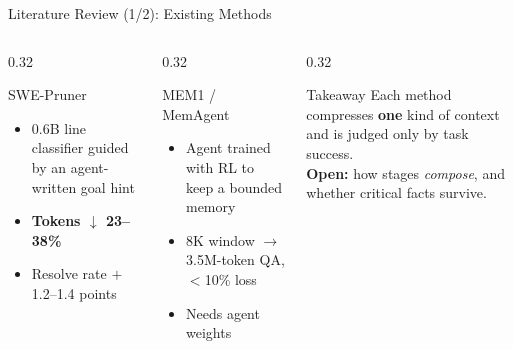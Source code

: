 \documentclass[aspectratio=169,10pt]{beamer}
\begin{document}
\begin{frame}{Literature Review (1/2): Existing Methods}
\begin{columns}[T]
\begin{column}{0.32\textwidth}
\begin{block}{SWE-Pruner \cite{SWEPruner}}
\footnotesize
\begin{itemize}
  \item 0.6B line classifier guided by an agent-written goal hint
  \item \textbf{Tokens $\downarrow$ 23--38\%}
  \item Resolve rate $+$1.2--1.4 points
\end{itemize}
\end{block}
\end{column}
\begin{column}{0.32\textwidth}
\begin{block}{MEM1 / MemAgent \cite{MEM1,MemAgent}}
\footnotesize
\begin{itemize}
  \item Agent trained with RL to keep a bounded memory
  \item 8K window $\to$ 3.5M-token QA, $<$10\% loss
  \item \textcolor{red!70!black}{Needs agent weights}
\end{itemize}
\end{block}
\end{column}
\begin{column}{0.32\textwidth}
\begin{alertblock}{Takeaway}
\footnotesize
Each method compresses \textbf{one} kind of context and is judged only by task success.\\[2pt]
\textbf{Open:} how stages \emph{compose}, and whether critical facts survive.
\end{alertblock}
\end{column}
\end{columns}
\end{frame}
\end{document}
